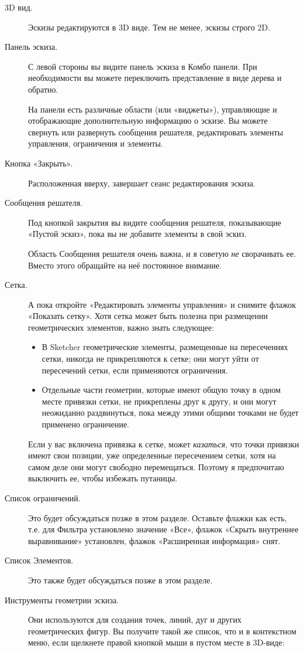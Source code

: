 \documentclass[12pt,titlepage]{article}
\begin{document}
\begin{description}

\item [3D вид.] Эскизы редактируются в 3D виде. Тем не менее, эскизы строго 2D.
\item [Панель эскиза.] С левой стороны вы видите панель эскиза в Комбо панели. При необходимости вы можете переключить представление в виде дерева и обратно.
      
      На панели есть различные области (или «виджеты»), управляющие и отображающие дополнительную информацию о эскизе. Вы можете свернуть или развернуть сообщения решателя, редактировать элементы управления, ограничения и элементы.
\item [Кнопка «Закрыть».] Расположенная вверху, завершает сеанс редактирования эскиза.
\item [Сообщения решателя.] Под кнопкой закрытия вы видите сообщения решателя, показывающие «Пустой эскиз», пока вы не добавите элементы в свой эскиз.
      
      Область Сообщения решателя очень важна, и я советую \emph {не} сворачивать ее. Вместо этого обращайте на неё  постоянное внимание.
\item [Сетка.] \label{GridSnap} А пока откройте «Редактировать элементы управления» и снимите флажок «Показать сетку». Хотя сетка может быть полезна при размещении геометрических элементов, важно знать следующее:
      \begin {itemize}
      \item В Sketcher геометрические элементы, размещенные на пересечениях сетки, никогда не прикрепляются к сетке; они могут уйти от пересечений сетки, если применяются ограничения.
      \item Отдельные части геометрии, которые имеют общую точку в одном месте привязки сетки, не прикреплены друг к другу, и они могут неожиданно раздвинуться, пока между этими общими точками не будет применено ограничение.
      \end {itemize}

      Если у вас включена привязка к сетке, может {\em казаться}, что точки привязки имеют свои позиции, уже определенные пересечением сетки, хотя на самом деле они могут свободно перемещаться. Поэтому я предпочитаю выключить ее, чтобы избежать путаницы.

\item [Список ограничений.] Это будет обсуждаться позже в этом разделе. Оставьте флажки как есть, т.е.  для Фильтра установлено значение «Все», флажок «Скрыть внутреннее выравнивание» установлен, флажок «Расширенная информация» снят.
\item [Список Элементов.] Это также будет обсуждаться позже в этом разделе.
\item [Инструменты геометрии эскиза.] Они используются для создания точек, линий, дуг и других геометрических фигур. Вы получите такой же список, что и в контекстном меню, если щелкнете правой кнопкой мыши в пустом месте в 3D-виде:


\end{description}
\end{document}
